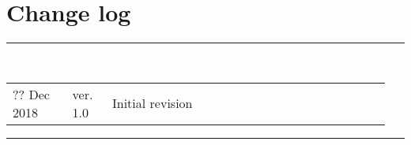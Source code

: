 \section*{\LARGE Change log}%
%
  \rule{\textwidth}{1.0pt}\\[5pt]%
  \begin{tabular}{>{\raggedright}p{0.15\linewidth}p{0.1\linewidth}p{0.7\linewidth}}
  	?? Dec 2018 & ver. 1.0 & Initial revision
  \end{tabular}\newline%
 \rule{\textwidth}{1.0pt}
